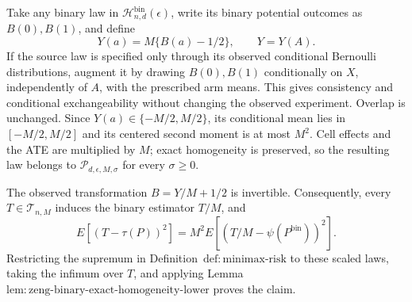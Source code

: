Take any binary law in \(\mathcal H_{n,d}^{\mathrm{bin}}(\epsilon)\), write its binary potential outcomes as \(B(0),B(1)\), and define
\[
 Y(a)=M\{B(a)-1/2\},\qquad Y=Y(A).
\tag{1}
\]
If the source law is specified only through its observed conditional Bernoulli distributions, augment it by drawing \(B(0),B(1)\) conditionally on \(X\), independently of \(A\), with the prescribed arm means.  This gives consistency and conditional exchangeability without changing the observed experiment.  Overlap is unchanged.  Since \(Y(a)\in\{-M/2,M/2\}\), its conditional mean lies in \([-M/2,M/2]\) and its centered second moment is at most \(M^2\).  Cell effects and the ATE are multiplied by \(M\); exact homogeneity is preserved, so the resulting law belongs to \(\mathcal P_{d,\epsilon,M,\sigma}\) for every \(\sigma\ge0\).

The observed transformation \(B=Y/M+1/2\) is invertible.  Consequently, every \(T\in\mathcal T_{n,M}\) induces the binary estimator \(T/M\), and
\[
 E[(T-\tau(P))^2]
 =M^2E[(T/M-\psi(P^{\mathrm{bin}}))^2].
\tag{2}
\]
Restricting the supremum in Definition~\(\mathrm{def:minimax\text{-}risk}\) to these scaled laws, taking the infimum over \(T\), and applying Lemma~\(\mathrm{lem:zeng\text{-}binary\text{-}exact\text{-}homogeneity\text{-}lower}\) proves the claim.